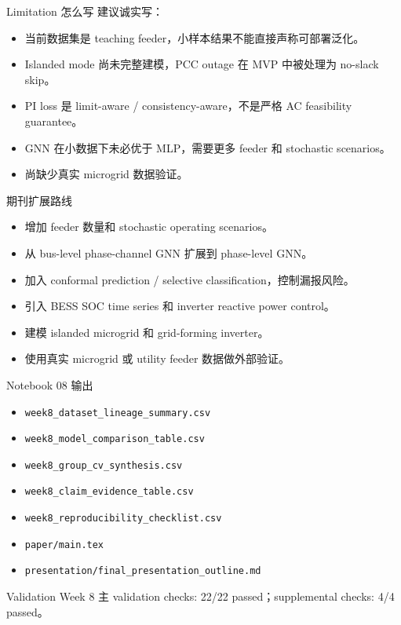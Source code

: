 \documentclass[aspectratio=169,11pt]{beamer}
\begin{document}
\begin{frame}{Limitation 怎么写}
建议诚实写：
\begin{itemize}
  \item 当前数据集是 teaching feeder，小样本结果不能直接声称可部署泛化。
  \item Islanded mode 尚未完整建模，PCC outage 在 MVP 中被处理为 no-slack skip。
  \item PI loss 是 limit-aware / consistency-aware，不是严格 AC feasibility guarantee。
  \item GNN 在小数据下未必优于 MLP，需要更多 feeder 和 stochastic scenarios。
  \item 尚缺少真实 microgrid 数据验证。
\end{itemize}
\end{frame}

\begin{frame}{期刊扩展路线}
\begin{itemize}
  \item 增加 feeder 数量和 stochastic operating scenarios。
  \item 从 bus-level phase-channel GNN 扩展到 phase-level GNN。
  \item 加入 conformal prediction / selective classification，控制漏报风险。
  \item 引入 BESS SOC time series 和 inverter reactive power control。
  \item 建模 islanded microgrid 和 grid-forming inverter。
  \item 使用真实 microgrid 或 utility feeder 数据做外部验证。
\end{itemize}
\end{frame}

\begin{frame}{Notebook 08 输出}
\begin{itemize}
  \item \texttt{week8\_dataset\_lineage\_summary.csv}
  \item \texttt{week8\_model\_comparison\_table.csv}
  \item \texttt{week8\_group\_cv\_synthesis.csv}
  \item \texttt{week8\_claim\_evidence\_table.csv}
  \item \texttt{week8\_reproducibility\_checklist.csv}
  \item \texttt{paper/main.tex}
  \item \texttt{presentation/final\_presentation\_outline.md}
\end{itemize}
\begin{block}{Validation}
Week 8 主 validation checks: 22/22 passed；supplemental checks: 4/4 passed。
\end{block}
\end{frame}
\end{document}
